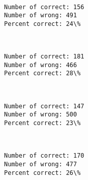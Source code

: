 \documentclass[11pt]{article}
\begin{document}
    \begin{center}
    \end{center}
    { \hspace*{\fill} \\}
    
    \begin{Verbatim}[commandchars=\\\{\}]
Number of correct: 156
Number of wrong: 491
Percent correct: 24\%

    \end{Verbatim}

    \begin{center}
    \end{center}
    { \hspace*{\fill} \\}
    
    \begin{Verbatim}[commandchars=\\\{\}]
Number of correct: 181
Number of wrong: 466
Percent correct: 28\%

    \end{Verbatim}

    \begin{center}
    \end{center}
    { \hspace*{\fill} \\}
    
    \begin{Verbatim}[commandchars=\\\{\}]
Number of correct: 147
Number of wrong: 500
Percent correct: 23\%

    \end{Verbatim}

    \begin{center}
    \end{center}
    { \hspace*{\fill} \\}
    
    \begin{Verbatim}[commandchars=\\\{\}]
Number of correct: 170
Number of wrong: 477
Percent correct: 26\%

    \end{Verbatim}
\end{document}

